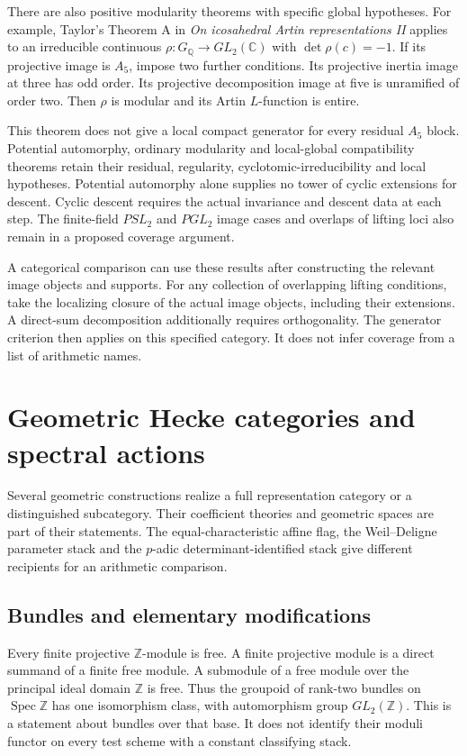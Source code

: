 There are also positive modularity theorems with specific global
hypotheses. For example, Taylor's Theorem A in
\emph{On icosahedral Artin representations II} applies to an
irreducible continuous
\(\rho:G_{\mathbb Q}\to GL_2(\mathbb C)\) with
\(\det\rho(c)=-1\).
If its projective image is \(A_5\), impose two further conditions.
Its projective inertia image at three has odd order.
Its projective decomposition image at five is unramified of order two.
Then \(\rho\) is modular and its Artin \(L\)-function is entire.

This theorem does not give a local compact generator for every
residual \(A_5\) block.
Potential automorphy, ordinary modularity and local-global
compatibility theorems retain their residual, regularity,
cyclotomic-irreducibility and local hypotheses.
Potential automorphy alone supplies no tower of cyclic extensions
for descent.
Cyclic descent requires the actual invariance and descent data
at each step. The finite-field \(PSL_2\) and \(PGL_2\) image cases
and overlaps of lifting loci also remain in a proposed coverage
argument.

A categorical comparison can use these results after constructing
the relevant image objects and supports. For any collection of
overlapping lifting conditions, take the localizing closure of
the actual image objects, including their extensions.
A direct-sum decomposition additionally requires orthogonality.
The generator criterion then applies on this specified category.
It does not infer coverage from a list of arithmetic names.


\section{Geometric Hecke categories and spectral actions}
\label{v4-arith:ic:geometric}

Several geometric constructions realize a full representation category
or a distinguished subcategory. Their coefficient theories and
geometric spaces are part of their statements.
The equal-characteristic affine flag, the Weil--Deligne parameter
stack and the \(p\)-adic determinant-identified stack give different
recipients for an arithmetic comparison.

\subsection{Bundles and elementary modifications}

Every finite projective \(\mathbb Z\)-module is free.
A finite projective module is a direct summand of a finite free
module. A submodule of a free module over the principal ideal
domain \(\mathbb Z\) is free.
Thus the groupoid of rank-two bundles on \(\operatorname{Spec}\mathbb Z\)
has one isomorphism class, with automorphism group \(GL_2(\mathbb Z)\).
This is a statement about bundles over that base.
It does not identify their moduli functor on every test scheme
with a constant classifying stack.

